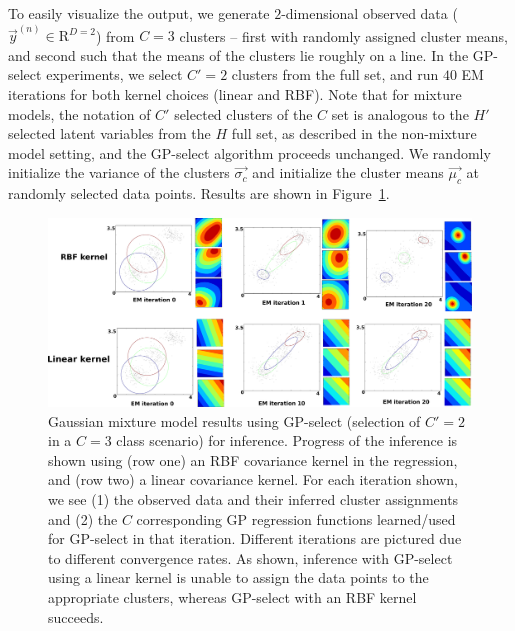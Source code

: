 To easily visualize the output, we generate $2$-dimensional observed data ($\vec{y}^{(n)} \in \mathrm{R}^{D=2} $) from $C=3$ clusters -- first with randomly assigned cluster means, and second such that the means of the clusters lie roughly on a line.
In the GP-select experiments, we select $C' = 2$ clusters from the full set,
and run $40$ EM iterations for both kernel choices (linear and RBF).
Note that for mixture models, the notation of $C'$ selected clusters of the $C$ set is analogous to the $H'$ selected latent variables from the $H$ full set, as described in the non-mixture model setting, and the GP-select algorithm proceeds unchanged.
We randomly initialize the variance of the clusters $\vec{\sigma_c}$ and initialize the cluster means $\vec{\mu_c}$ at randomly selected data points.
Results are shown in Figure~\ref{fig:mog}.

\begin{figure}[t]
\begin{center}
\includegraphics[width=1\textwidth]{mog/mog_labels2.pdf}%
\caption{Gaussian mixture model results using GP-select (selection of $C'=2$ in a $C=3$ class scenario) for inference.
Progress of the inference is shown using (row one) an RBF covariance kernel in the regression, and (row two) a linear covariance kernel.
For each iteration shown, we see (1) the observed data and their inferred cluster assignments and (2) the $C$ corresponding GP regression functions learned/used for GP-select in that iteration. Different iterations are pictured due to different convergence rates. As shown, inference with GP-select using a linear kernel is unable to assign the data points to the appropriate clusters, whereas GP-select with an RBF kernel succeeds.}\label{fig:mog}%
\end{center}
\end{figure}

